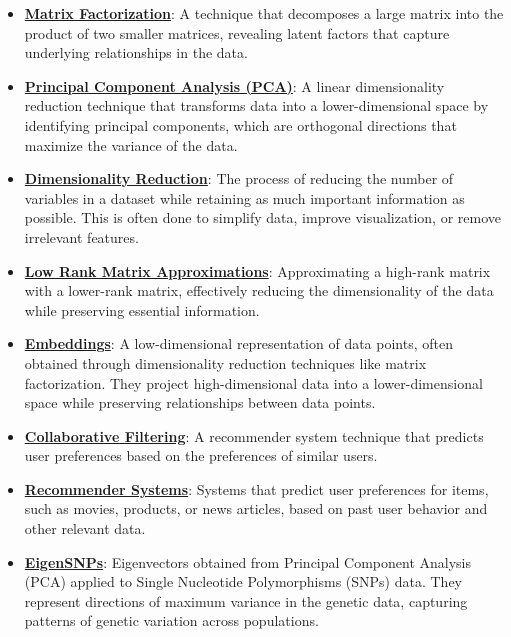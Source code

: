 \documentclass{article}%
\begin{document}
\begin{itemize}[leftmargin=*]%
\item \href{https://www.math.purdue.edu/~yipn/351/11L2-svd-pca-recommender.pdf#page=2}{\textbf{Matrix Factorization}}: A technique that decomposes a large matrix into the product of two smaller matrices, revealing latent factors that capture underlying relationships in the data.%
\item \href{https://www.math.purdue.edu/~yipn/351/11L2-svd-pca-recommender.pdf#page=8}{\textbf{Principal Component Analysis (PCA)}}: A linear dimensionality reduction technique that transforms data into a lower-dimensional space by identifying principal components, which are orthogonal directions that maximize the variance of the data.%
\item \href{https://www.math.purdue.edu/~yipn/351/11L2-svd-pca-recommender.pdf#page=8}{\textbf{Dimensionality Reduction}}: The process of reducing the number of variables in a dataset while retaining as much important information as possible. This is often done to simplify data, improve visualization, or remove irrelevant features.%
\item \href{https://www.math.purdue.edu/~yipn/351/11L2-svd-pca-recommender.pdf#page=9}{\textbf{Low Rank Matrix Approximations}}: Approximating a high-rank matrix with a lower-rank matrix, effectively reducing the dimensionality of the data while preserving essential information.%
\item \href{https://www.math.purdue.edu/~yipn/351/11L2-svd-pca-recommender.pdf#page=5}{\textbf{Embeddings}}: A low-dimensional representation of data points, often obtained through dimensionality reduction techniques like matrix factorization. They project high-dimensional data into a lower-dimensional space while preserving relationships between data points.%
\item \href{https://www.math.purdue.edu/~yipn/351/11L2-svd-pca-recommender.pdf#page=33}{\textbf{Collaborative Filtering}}: A recommender system technique that predicts user preferences based on the preferences of similar users.%
\item \href{https://www.math.purdue.edu/~yipn/351/11L2-svd-pca-recommender.pdf#page=29}{\textbf{Recommender Systems}}: Systems that predict user preferences for items, such as movies, products, or news articles, based on past user behavior and other relevant data.%
\item \href{https://www.math.purdue.edu/~yipn/351/11L2-svd-pca-recommender.pdf#page=28}{\textbf{EigenSNPs}}: Eigenvectors obtained from Principal Component Analysis (PCA) applied to Single Nucleotide Polymorphisms (SNPs) data. They represent directions of maximum variance in the genetic data, capturing patterns of genetic variation across populations.%

\end{itemize}
\end{document}
